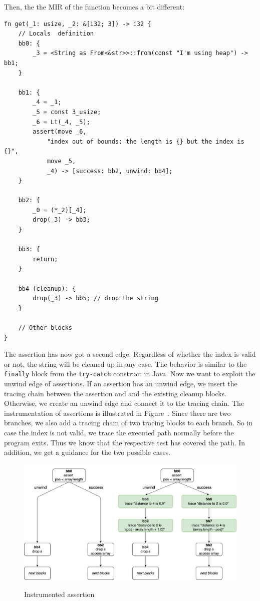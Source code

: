 \documentclass{article}
\begin{document}
Then, the the \ac{MIR} of the function becomes a bit different:
\begin{lstlisting}[language={}, style=boxed, caption={}, label=lst:mir-boundary-check-with-unwinding]
fn get(_1: usize, _2: &[i32; 3]) -> i32 {
    // Locals  definition
    bb0: {
        _3 = <String as From<&str>>::from(const "I'm using heap") -> bb1;
    }

    bb1: {
        _4 = _1;
        _5 = const 3_usize;
        _6 = Lt(_4, _5);
        assert(move _6,
            "index out of bounds: the length is {} but the index is {}",
            move _5,
            _4) -> [success: bb2, unwind: bb4];
    }

    bb2: {
        _0 = (*_2)[_4];
        drop(_3) -> bb3;
    }

    bb3: {
        return;
    }

    bb4 (cleanup): {
        drop(_3) -> bb5; // drop the string
    }

    // Other blocks
}
\end{lstlisting}

The assertion has now got a second edge. Regardless of whether the index is valid or not, the string will be cleaned up in any case. The behavior is similar to the \lstinline{finally} block from the \lstinline{try-catch} construct in Java. Now we want to exploit the unwind edge of assertions. If an assertion has an unwind edge, we insert the tracing chain between the assertion and and the existing cleanup blocks. Otherwise, we create an unwind edge and connect it to the tracing chain. The instrumentation of assertions is illustrated in Figure~. Since there are two branches, we also add a tracing chain of two tracing blocks to each branch. So in case the index is not valid, we trace the executed path normally before the program exits. Thus we know that the respective test has covered the path. In addition, we get a guidance for the two possible cases.

\begin{figure}[h]
\caption{Instrumented assertion}
\centering
\includegraphics[width=\textwidth]{comparison-instrumented-assertion}
\label{fig:comparison-instrumented-assertion}
\end{figure}
\end{document}
